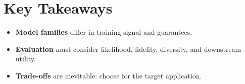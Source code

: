 
\section*{Key Takeaways}

\begin{keytakeaways}
\begin{itemize}[leftmargin=2em]
    \item \textbf{Model families} differ in training signal and guarantees.
    \item \textbf{Evaluation} must consider likelihood, fidelity, diversity, and downstream utility.
    \item \textbf{Trade-offs} are inevitable: choose for the target application.
\end{itemize}
\end{keytakeaways}


